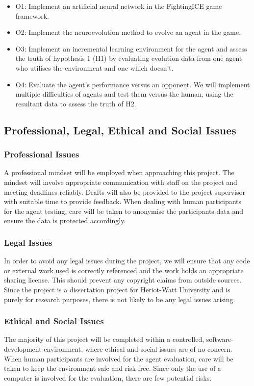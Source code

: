 \documentclass[12pt,a4paper]{article}
\begin{document}
\begin{itemize}
\item {O1: Implement an artificial neural network in the FightingICE game framework.}
\item {O2: Implement the neuroevolution method to evolve an agent in the game.}
\item {O3: Implement an incremental learning environment for the agent and assess the truth of hypothesis 1 (H1) by evaluating evolution data from one agent who utilises the environment and one which doesn't.}
\item {O4: Evaluate the agent's performance versus an opponent. We will implement multiple difficulties of agents and test them versus the human, using the resultant data to assess the truth of H2.} 
\end{itemize}
\newpage
\subsection{Professional, Legal, Ethical and Social Issues}
\subsubsection{Professional Issues}
A professional mindset will be employed when approaching this project. The mindset will involve appropriate communication with staff on the project and meeting deadlines reliably. Drafts will also be provided to the project supervisor with suitable time to provide feedback. When dealing with human participants for the agent testing, care will be taken to anonymise the participants data and ensure the data is protected accordingly.

\subsubsection{Legal Issues}
In order to avoid any legal issues during the project, we will ensure that any code or external work used is correctly referenced and the work holds an appropriate sharing license. This should prevent any copyright claims from outside sources. Since the project is a dissertation project for Heriot-Watt University and is purely for research purposes, there is not likely to be any legal issues arising.

\subsubsection{Ethical and Social Issues}
The majority of this project will be completed within a controlled, software-development environment, where ethical and social issues are of no concern. When human participants are involved for the agent evaluation, care will be taken to keep the environment safe and risk-free. Since only the use of a computer is involved for the evaluation, there are few potential risks.
\newpage
\end{document}

